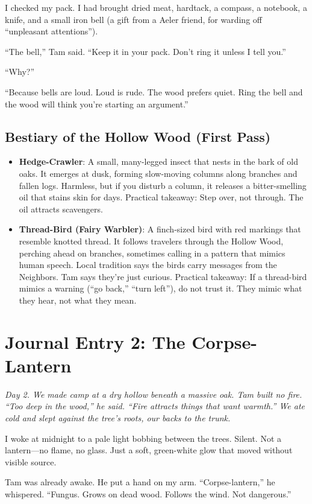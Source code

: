 \documentclass[11pt]{article}
\begin{document}
I checked my pack. I had brought dried meat, hardtack, a compass, a notebook, a knife, and a small iron bell (a gift from a Aeler friend, for warding off ``unpleasant attentions'').

``The bell,'' Tam said. ``Keep it in your pack. Don't ring it unless I tell you.''

``Why?''

``Because bells are loud. Loud is rude. The wood prefers quiet. Ring the bell and the wood will think you're starting an argument.''

\subsection*{Bestiary of the Hollow Wood (First Pass)}
\begin{itemize}
    \item \textbf{Hedge-Crawler}: A small, many-legged insect that nests in the bark of old oaks. It emerges at dusk, forming slow-moving columns along branches and fallen logs. Harmless, but if you disturb a column, it releases a bitter-smelling oil that stains skin for days. Practical takeaway: Step over, not through. The oil attracts scavengers.
    \item \textbf{Thread-Bird (Fairy Warbler)}: A finch-sized bird with red markings that resemble knotted thread. It follows travelers through the Hollow Wood, perching ahead on branches, sometimes calling in a pattern that mimics human speech. Local tradition says the birds carry messages from the Neighbors. Tam says they're just curious. Practical takeaway: If a thread-bird mimics a warning (``go back,'' ``turn left''), do not trust it. They mimic what they hear, not what they mean.
\end{itemize}

\section*{Journal Entry 2: The Corpse-Lantern}
\textit{Day 2. We made camp at a dry hollow beneath a massive oak. Tam built no fire. ``Too deep in the wood,'' he said. ``Fire attracts things that want warmth.'' We ate cold and slept against the tree's roots, our backs to the trunk.}

I woke at midnight to a pale light bobbing between the trees. Silent. Not a lantern---no flame, no glass. Just a soft, green-white glow that moved without visible source.

Tam was already awake. He put a hand on my arm. ``Corpse-lantern,'' he whispered. ``Fungus. Grows on dead wood. Follows the wind. Not dangerous.''
\end{document}
